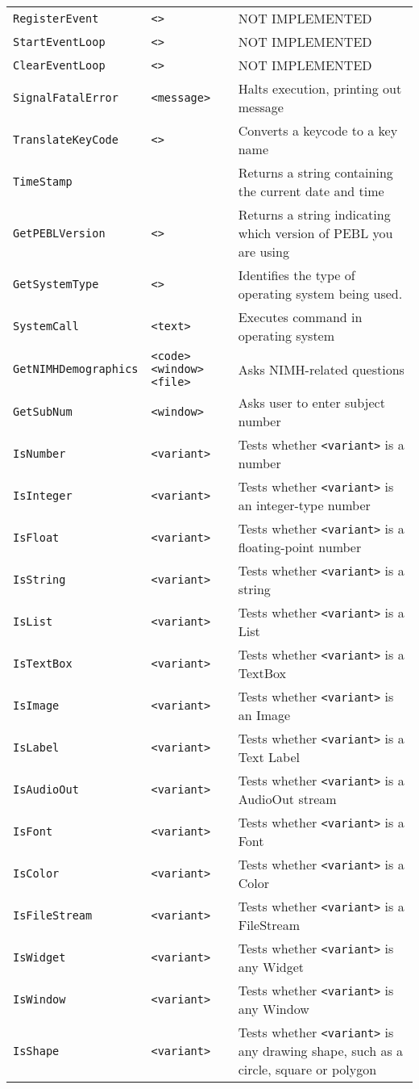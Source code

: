 \begin{longtable}{p{3cm}p{3cm}p{6cm}}
\verb+RegisterEvent+ &\verb+<>+ & NOT IMPLEMENTED\\ 
\verb+StartEventLoop+ &\verb+<>+ & NOT IMPLEMENTED\\ 
\verb+ClearEventLoop+ &\verb+<>+ & NOT IMPLEMENTED\\ 
\verb+SignalFatalError+ &\verb+<message>+ & Halts execution, printing out message \\ 
\verb+TranslateKeyCode+ &\verb+<>+ &Converts a keycode to a key name\\ 
\verb+TimeStamp+ & &Returns a string containing the current date and time\\ 
\verb+GetPEBLVersion+ &\verb+<>+ &Returns a string indicating which version of PEBL you are using\\ 
\verb+GetSystemType+ &\verb+<>+ &Identifies the type of operating system being used.\\ 
\verb+SystemCall+ &\verb+<text>+ &Executes command in operating system\\ 
\verb+GetNIMHDemographics+ & \hspace{0.7cm}\verb+<code>+ \verb+<window>+ \verb+<file>+ & Asks NIMH-related questions\\ 
\verb+GetSubNum+ & \verb+<window>+ & Asks user to enter subject number\\
\verb+IsNumber+ & \verb+<variant>+ & Tests whether \verb+<variant>+ is a number \\ 
\verb+IsInteger+ & \verb+<variant>+ & Tests whether \verb+<variant>+ is an integer-type number\\ 
\verb+IsFloat+ & \verb+<variant>+ & Tests whether \verb+<variant>+ is a floating-point number\\ 
\verb+IsString+ & \verb+<variant>+ & Tests whether \verb+<variant>+ is a string\\ 
\verb+IsList+ & \verb+<variant>+ & Tests whether \verb+<variant>+ is a List\\ 
\verb+IsTextBox+ & \verb+<variant>+ & Tests whether \verb+<variant>+ is a TextBox\\ 
\verb+IsImage+ & \verb+<variant>+ & Tests whether \verb+<variant>+ is an Image\\ 
\verb+IsLabel+ & \verb+<variant>+ & Tests whether \verb+<variant>+ is a Text Label\\ 
\verb+IsAudioOut+ & \verb+<variant>+ & Tests whether \verb+<variant>+ is a AudioOut stream\\ 
\verb+IsFont+ & \verb+<variant>+ & Tests whether \verb+<variant>+ is a Font\\ 
\verb+IsColor+ & \verb+<variant>+ & Tests whether \verb+<variant>+ is a Color\\ 
\verb+IsFileStream+ & \verb+<variant>+ & Tests whether \verb+<variant>+ is a FileStream\\ 
\verb+IsWidget+ & \verb+<variant>+ & Tests whether \verb+<variant>+ is
any Widget\\ 
\verb+IsWindow+ & \verb+<variant>+ & Tests whether \verb+<variant>+ is
any Window\\ 
\verb+IsShape+ & \verb+<variant>+ & Tests whether \verb+<variant>+ is any drawing shape, such as a circle, square or polygon\\ 


\end{longtable}
